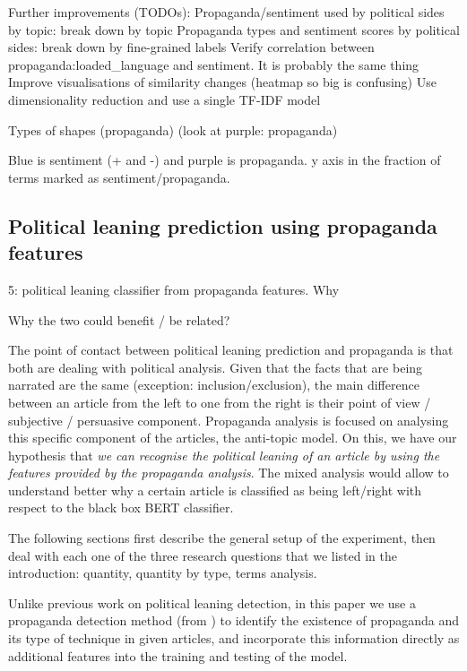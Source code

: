 Further improvements (TODOs):
Propaganda/sentiment used by political sides by topic: break down by topic
Propaganda types and sentiment scores by political sides: break down by fine-grained labels
Verify correlation between propaganda:loaded\_language and sentiment. It is probably the same thing
Improve visualisations of similarity changes (heatmap so big is confusing)
Use dimensionality reduction and use a single TF-IDF model



Types of shapes (propaganda)
(look at purple: propaganda)

Blue is sentiment (+ and -) and purple is propaganda. 
y axis in the fraction of terms marked as sentiment/propaganda.




\subsection{Political leaning prediction using propaganda features}
5: political leaning classifier from propaganda features. Why


Why the two could benefit / be related?

The point of contact between political leaning prediction and propaganda is that both are dealing with political analysis.
Given that the facts that are being narrated are the same (exception: inclusion/exclusion), the main difference between an article from the left to one from the right is their point of view / subjective / persuasive component. Propaganda analysis is focused on analysing this specific component of the articles, the anti-topic model.
On this, we have our hypothesis that \emph{we can recognise the political leaning of an article by using the features provided by the propaganda analysis}.
The mixed analysis would allow to understand better why a certain article is classified as being left/right with respect to the black box BERT classifier.

The following sections first describe the general setup of the experiment, then deal with each one of the three research questions that we listed in the introduction: quantity, quantity by type, terms analysis.%


Unlike previous work on political leaning detection, in this paper we use a propaganda detection method (from \citet{da2019fine}) to identify the existence of propaganda and its type of technique in given articles, and incorporate this information directly as additional features into the training and testing of the model.  

